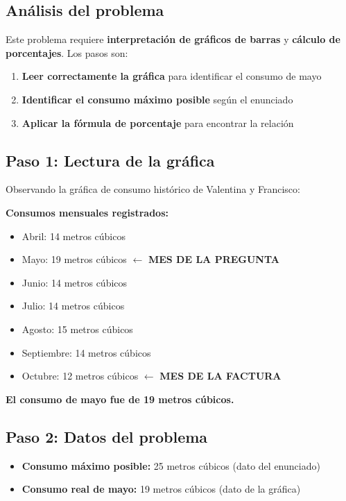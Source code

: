 \documentclass[a4paper]{article}
\newenvironment{solution}{}{}
\begin{document}
\begin{solution}

\subsection*{Análisis del problema}

Este problema requiere \textbf{interpretación de gráficos de barras} y \textbf{cálculo de porcentajes}. Los pasos son:

\begin{enumerate}
\item \textbf{Leer correctamente la gráfica} para identificar el consumo de mayo
\item \textbf{Identificar el consumo máximo posible} según el enunciado
\item \textbf{Aplicar la fórmula de porcentaje} para encontrar la relación
\end{enumerate}

\subsection*{Paso 1: Lectura de la gráfica}

Observando la gráfica de consumo histórico de Valentina y Francisco:

\textbf{Consumos mensuales registrados:}\begin{itemize}\item Abril: 14 metros cúbicos
\item Mayo: 19 metros cúbicos $\leftarrow$ \textbf{MES DE LA PREGUNTA}
\item Junio: 14 metros cúbicos
\item Julio: 14 metros cúbicos
\item Agosto: 15 metros cúbicos
\item Septiembre: 14 metros cúbicos
\item Octubre: 12 metros cúbicos $\leftarrow$ \textbf{MES DE LA FACTURA}\end{itemize}
\textbf{El consumo de mayo fue de 19 metros cúbicos.}

\subsection*{Paso 2: Datos del problema}

\begin{itemize}
\item \textbf{Consumo máximo posible:} 25 metros cúbicos (dato del enunciado)
\item \textbf{Consumo real de mayo:} 19 metros cúbicos (dato de la gráfica)
\end{itemize}


\end{solution}
\end{document}
